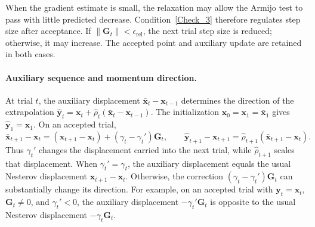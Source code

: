 \documentclass{article}
\begin{document}
When the gradient estimate is small, the relaxation may allow
the Armijo test to pass with little predicted decrease.
Condition~\eqref{Check_3} therefore regulates step size 
after acceptance. If \(\|\mathbf G_t\|<\epsilon_{\mathrm{rel}}\),
the next trial step size is reduced; otherwise, it may increase.
The accepted point and auxiliary update are retained in both cases.

\paragraph{Auxiliary sequence and momentum direction.}
At trial \(t\), the auxiliary displacement
\(\bar {\bm{x}}_t-\bm{x}_{t-1}\) determines the direction of the extrapolation
\(\hat {\bm{y}}_t=\bm{x}_t+\hat\rho_t(\bar {\bm{x}}_t-\bm{x}_{t-1})\).
The initialization \(\bm{x}_0=\bm{x}_1=\bar {\bm{x}}_1\) gives
\(\hat {\bm{y}}_1=\bm{x}_1\).
On an accepted trial,
\[
\bar {\bm{x}}_{t+1}-\bm{x}_t
=
(\bm{x}_{t+1}-\bm{x}_t)+(\gamma_t-\gamma_t')\mathbf{G}_t,
\qquad
\hat {\bm{y}}_{t+1}-\bm{x}_{t+1}
=
\hat\rho_{t+1}(\bar {\bm{x}}_{t+1}-\bm{x}_t).
\]
Thus \(\gamma_t'\) changes the displacement carried into the next
trial, while \(\hat\rho_{t+1}\) scales that displacement.
When \(\gamma_t'=\gamma_t\), the auxiliary displacement equals
the usual Nesterov displacement \(\bm{x}_{t+1}-\bm{x}_t\).
Otherwise, the correction
\((\gamma_t-\gamma_t')\mathbf{G}_t\) can substantially change its
direction. For example, on an accepted trial with \(\bm{y}_t=\bm{x}_t\),
\(\mathbf{G}_t\ne0\), and \(\gamma_t'<0\), the auxiliary displacement
\(-\gamma_t'\mathbf{G}_t\) is opposite to the usual Nesterov
displacement \(-\gamma_t\mathbf{G}_t\).
\end{document}
